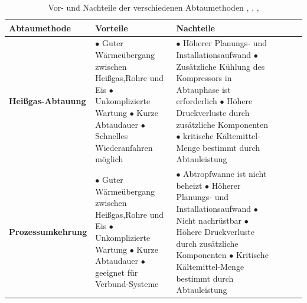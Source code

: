 \begin{table}%
\centering
\caption{Vor- und Nachteile der verschiedenen Abtaumethoden   	\citep{Breidenbach2014}, \citep{Refrigeration2000}, \citep{Yin2012}, \citep{Huang20091697}
} \vspace{6pt}

\label{fig:PCM_Slurry1}
\begin{tabular}{p{3.8cm}p{5.6cm}p{5.6cm}lll}
\hline
\textbf{Abtaumethode} &\textbf{Vorteile} & \textbf{Nachteile}\\
\hline
\hline

\textbf{Heißgas-Abtauung} 
&
$\bullet$ Guter Wärmeübergang zwischen Heißgas,Rohre und Eis
\newline								  			
$\bullet$ Unkomplizierte Wartung
\newline			  
$\bullet$ Kurze Abtaudauer		
\newline			
$\bullet$ Schnelles Wiederanfahren möglich	

&$\bullet$ Höherer Planungs- und Installationsaufwand  
\newline
$\bullet$ Zusätzliche Kühlung des Kompressors in Abtauphase ist erforderlich 
\newline 
$\bullet$ Höhere Druckverluste durch zusätzliche Komponenten 
\newline
$\bullet$ kritische Kältemittel-Menge bestimmt durch Abtauleistung \\  
   
\hline
\textbf{Prozessumkehrung}
&$\bullet$ Guter Wärmeübergang zwischen Heißgas,Rohre und Eis  													
\newline								
$\bullet$ Unkomplizierte Wartung
\newline	
$\bullet$ Kurze Abtaudauer		
\newline			 
$\bullet$ geeignet für Verbund-Systeme		
&$\bullet$ Abtropfwanne ist nicht beheizt   
\newline
$\bullet$ Höherer Planungs- und Installationsaufwand
\newline
$\bullet$ Nicht nachrüstbar
\newline
$\bullet$ Höhere Druckverluste durch zusätzliche Komponenten								
\newline
$\bullet$ Kritische Kältemittel-Menge bestimmt durch Abtauleistung\\



\end{tabular}
\end{table}
